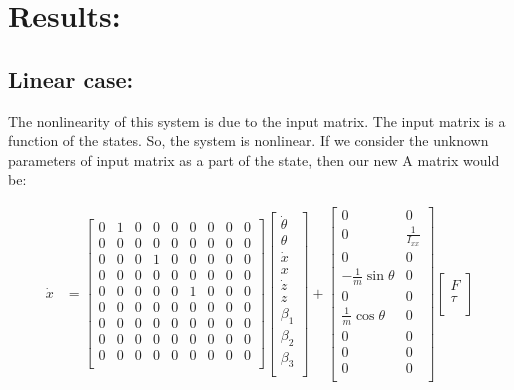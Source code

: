 \documentclass[12pt]{article}
\begin{document}
\section*{Results:}

\subsection*{Linear case:}
The nonlinearity of this system is due to the input matrix. The input matrix is a function of the states. So, the system is nonlinear. If we consider the unknown parameters of input matrix as a part of the state, then our new A matrix would be:

\begin{align*}
    \dot{x} &= \begin{bmatrix}
        0 & 1 & 0 & 0 & 0 & 0 & 0 & 0 & 0 \\
        0 & 0 & 0 & 0 & 0 & 0 & 0 & 0 & 0 \\
        0 & 0 & 0 & 1 & 0 & 0 & 0 & 0 & 0 \\
        0 & 0 & 0 & 0 & 0 & 0 & 0 & 0 & 0 \\
        0 & 0 & 0 & 0 & 0 & 1 & 0 & 0 & 0 \\
        0 & 0 & 0 & 0 & 0 & 0 & 0 & 0 & 0 \\
        0 & 0 & 0 & 0 & 0 & 0 & 0 & 0 & 0 \\
        0 & 0 & 0 & 0 & 0 & 0 & 0 & 0 & 0 \\
        0 & 0 & 0 & 0 & 0 & 0 & 0 & 0 & 0 \\
    \end{bmatrix} \begin{bmatrix}
        \dot{\theta} \\
        \theta \\
        \dot{x} \\
        x \\
        \dot{z} \\
        z \\
        \beta_1 \\
        \beta_2 \\
        \beta_3 \\
    \end{bmatrix} + \begin{bmatrix}
        0 & 0 \\
        0 & \frac{1}{I_{xx}} \\
        0 & 0 \\
        - \frac{1}{m} \sin{\theta} & 0 \\
        0 & 0 \\
        \frac{1}{m} \cos{\theta} & 0 \\
        0 & 0 \\
        0 & 0 \\
        0 & 0 \\
    \end{bmatrix} \begin{bmatrix}
        F \\
        \tau \\
    \end{bmatrix} 
\end{align*}
\end{document}
